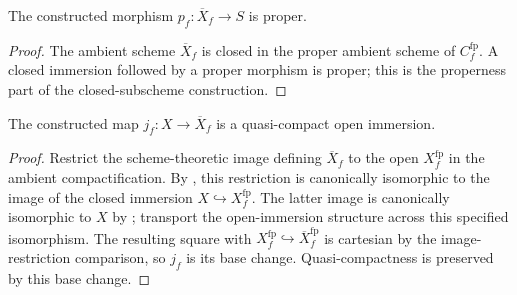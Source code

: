 \begin{lemma}

  \label{lemma:nagata-final-ambient-proper}

  The constructed morphism $p_f\colon\overline X_f\to S$ is proper.
\end{lemma}

\begin{proof}
  The ambient scheme $\overline X_f$ is closed in the proper ambient scheme
  of $C_f^{\mathrm{fp}}$.  A closed immersion followed by a proper morphism is
  proper; this is the properness part of the closed-subscheme construction.
\end{proof}

\begin{lemma}
  \label{lemma:nagata-final-open-immersion}

  The constructed map $j_f\colon X\to\overline X_f$ is a quasi-compact open
  immersion.
\end{lemma}

\begin{proof}
  Restrict the scheme-theoretic image defining $\overline X_f$ to the open
  $X_f^{\mathrm{fp}}$ in the ambient compactification.  By
  , this restriction is
  canonically isomorphic to the image of the closed immersion
  $X\hookrightarrow X_f^{\mathrm{fp}}$.  The latter image is canonically
  isomorphic to $X$ by
  ; transport the
  open-immersion structure across this specified isomorphism.  The resulting
  square with $X_f^{\mathrm{fp}}\hookrightarrow
  \overline X_f^{\mathrm{fp}}$ is cartesian by the image-restriction
  comparison, so $j_f$ is its base change.  Quasi-compactness is preserved by
  this base change.
\end{proof}

